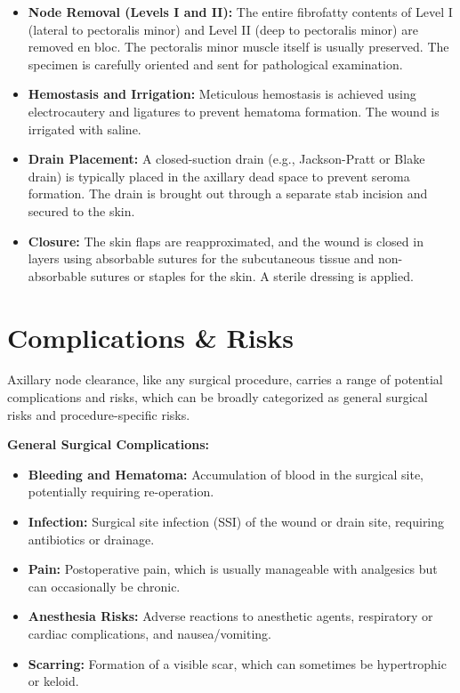 \begin{itemize}
\begin{itemize}
    \end{itemize}
  \item \textbf{Node Removal (Levels I and II):} The entire fibrofatty contents of Level I (lateral to pectoralis minor) and Level II (deep to pectoralis minor) are removed en bloc. The pectoralis minor muscle itself is usually preserved. The specimen is carefully oriented and sent for pathological examination.
  \item \textbf{Hemostasis and Irrigation:} Meticulous hemostasis is achieved using electrocautery and ligatures to prevent hematoma formation. The wound is irrigated with saline.
  \item \textbf{Drain Placement:} A closed-suction drain (e.g., Jackson-Pratt or Blake drain) is typically placed in the axillary dead space to prevent seroma formation. The drain is brought out through a separate stab incision and secured to the skin.
  \item \textbf{Closure:} The skin flaps are reapproximated, and the wound is closed in layers using absorbable sutures for the subcutaneous tissue and non-absorbable sutures or staples for the skin. A sterile dressing is applied.
\end{itemize}

\section*{Complications \& Risks}
Axillary node clearance, like any surgical procedure, carries a range of potential complications and risks, which can be broadly categorized as general surgical risks and procedure-specific risks.

\textbf{General Surgical Complications:}
\begin{itemize}
  \item \textbf{Bleeding and Hematoma:} Accumulation of blood in the surgical site, potentially requiring re-operation.
  \item \textbf{Infection:} Surgical site infection (SSI) of the wound or drain site, requiring antibiotics or drainage.
  \item \textbf{Pain:} Postoperative pain, which is usually manageable with analgesics but can occasionally be chronic.
  \item \textbf{Anesthesia Risks:} Adverse reactions to anesthetic agents, respiratory or cardiac complications, and nausea/vomiting.
  \item \textbf{Scarring:} Formation of a visible scar, which can sometimes be hypertrophic or keloid.
\end{itemize}

